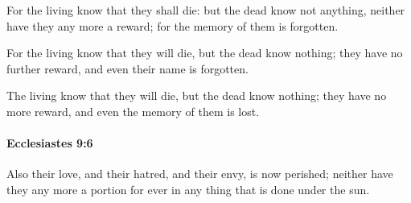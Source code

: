 			\begin{versebox}
					\item[BHS] 
					\item[LXX] 
					\item[ASV] For the living know that they shall die: but the dead know not anything, neither have they any more a reward; for the memory of them is forgotten.
					\item[NIV] For the living know that they will die, but the dead know nothing; they have no further reward, and even their name is forgotten.
					\item[NRSV] The living know that they will die, but the dead know nothing; they have no more reward, and even the memory of them is lost.
			\end{versebox}

		\paragraph{Ecclesiastes 9:6} %
			\label{ECCLESIASTES-9-6}

			Also their love, and their hatred, and their envy, is now perished; neither have they any more a portion for ever in any thing that is done under the sun.

